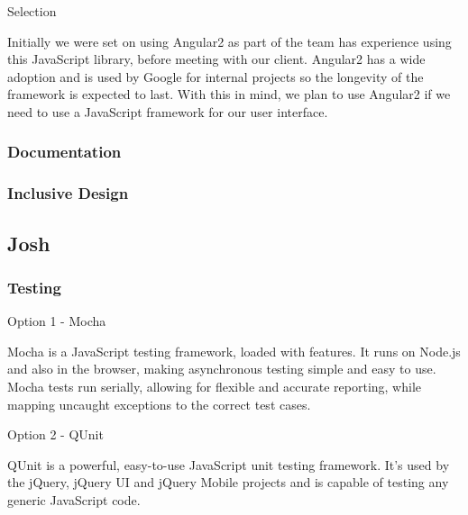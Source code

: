 \documentclass[letterpaper, 10pt, draftclsnofoot, compsoc, onecolumn]{IEEEtran}
\begin{document}
{\medskip
{\noindent Selection \par}
{\noindent Initially we were set on using Angular2 as part of the team has experience using this JavaScript library, before meeting with our client. Angular2 has a wide adoption and is used by Google for internal projects so the longevity of the framework is expected to last. With this in mind, we plan to use Angular2 if we need to use a JavaScript framework for our user interface. \par}




\newpage
\subsubsection{Documentation}
{\noindent \par}

\medskip
\newpage
\subsubsection{Inclusive Design}
{\noindent \par}

\medskip


\newpage
\subsection{Josh}
\vspace{1pc}

\subsubsection{Testing}
{\noindent \par}

{\noindent Option 1 - Mocha \par}
{\noindent Mocha is a JavaScript testing framework, loaded with features. It runs on Node.js and also in the browser, making asynchronous testing simple and easy to use. Mocha tests run serially, allowing for flexible and accurate reporting, while mapping uncaught exceptions to the correct test cases. \cite{Mocha} \par}

\medskip
{\noindent Option 2 - QUnit \par}
{\noindent QUnit is a powerful, easy-to-use JavaScript unit testing framework. It's used by the jQuery, jQuery UI and jQuery Mobile projects and is capable of testing any generic JavaScript code. \cite{QUnit}  \par}

}
\end{document}
